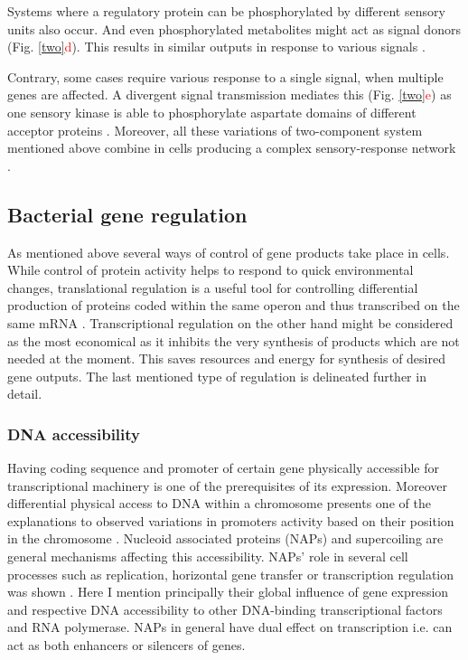 Systems where a regulatory protein can be phosphorylated by different sensory units also occur.
And even phosphorylated metabolites might act as signal donors (Fig. \ref{two}\textcolor{red}{d}).
This results in similar outputs in response to various signals \cite{kaczmarczyk2014complex, chambonnier2016hybrid}.

Contrary, some cases require various response to a single signal, when multiple genes are affected.
A divergent signal transmission mediates this (Fig. \ref{two}\textcolor{red}{e}) as one sensory kinase is able to phosphorylate aspartate domains of different acceptor proteins \cite{mika2005two, groisman2016feedback}.
Moreover, all these variations of two-component system mentioned above combine in cells producing a complex sensory-response network \cite{kaczmarczyk2014complex, chambonnier2016hybrid}.

\subsection{Bacterial gene regulation}
As mentioned above several ways of control of gene products take place in cells.
While control of protein activity helps to respond to quick environmental changes, translational regulation is a useful tool for controlling differential production of proteins coded within the same operon and thus transcribed on the same mRNA \cite{dar2018extensive}.
Transcriptional regulation on the other hand might be considered as the most economical as it inhibits the very synthesis of products which are not needed at the moment.
This saves resources and energy for synthesis of desired gene outputs.
The last mentioned type of regulation is delineated further in detail.

\subsubsection{DNA accessibility}
Having coding sequence and promoter of certain gene physically accessible for transcriptional machinery is one of the prerequisites of its expression.
Moreover differential physical access to DNA within a chromosome presents one of the explanations to observed variations in promoters activity based on their position in the chromosome \cite{bryant2014chromosome}.
Nucleoid associated proteins (NAPs) and supercoiling are general mechanisms affecting this accessibility.
NAPs' role in several cell processes such as replication, horizontal gene transfer or transcription regulation was shown \cite{dixon1984protein, kayoko1992histone, aznar2013hha}.
Here I mention principally their global influence of gene expression and respective DNA accessibility to other DNA-binding transcriptional factors and RNA polymerase.
NAPs in general have dual effect on transcription i.e. can act as both enhancers or silencers of genes.

